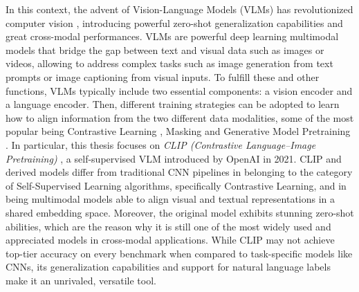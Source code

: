 \documentclass[a4paper, twoside, english]{sapthesis} %
\begin{document}
In this context, the advent of Vision-Language Models (VLMs) has revolutionized computer vision \cite{marimo2025beyond}, introducing powerful zero-shot generalization capabilities and great cross-modal performances. VLMs are powerful deep learning multimodal models that bridge the gap between text and visual data such as images or videos, allowing to address complex tasks such as image generation from text prompts or image captioning from visual inputs. To fulfill these and other functions, VLMs typically include two essential components: a vision encoder and a language encoder. 
Then, different training strategies can be adopted to learn how to align information from the two different data modalities, some of the most popular being Contrastive Learning \cite{radford2021learning} \cite{chen2020simple} \cite{he2020momentum} \cite{jia2021scaling}, Masking \cite{singh2022flava} and Generative Model Pretraining \cite{ramesh2022hierarchical} \cite{rombach2022high} \cite{saharia2022photorealistic} \cite{alayrac2022flamingo}. In particular, this thesis focuses on \emph{CLIP (Contrastive Language–Image Pretraining)} \cite{radford2021learning}, a self-supervised VLM introduced by OpenAI in 2021. CLIP and derived models differ from traditional CNN pipelines in belonging to the category of Self-Supervised Learning algorithms, specifically Contrastive Learning, and in being multimodal models able to align visual and textual representations in a shared embedding space. Moreover, the original model exhibits stunning zero-shot abilities, which are the reason why it is still one of the most widely used and appreciated models in cross-modal applications. While CLIP may not achieve top-tier accuracy on every benchmark when compared to task-specific models like CNNs, its generalization capabilities and support for natural language labels make it an unrivaled, versatile tool. \\
\end{document}
